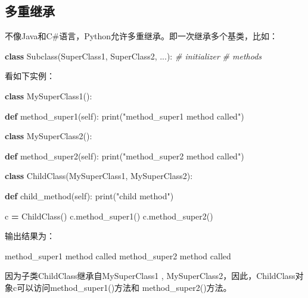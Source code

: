 \documentclass[]{ctexbook}
\newenvironment{Shaded}{\begin{snugshade}}{\end{snugshade}}
\newcommand{\BuiltInTok}[1]{#1}
\newcommand{\CommentTok}[1]{\textcolor[rgb]{0.56,0.35,0.01}{\textit{#1}}}
\newcommand{\KeywordTok}[1]{\textcolor[rgb]{0.13,0.29,0.53}{\textbf{#1}}}
\newcommand{\NormalTok}[1]{#1}
\newcommand{\OperatorTok}[1]{\textcolor[rgb]{0.81,0.36,0.00}{\textbf{#1}}}
\newcommand{\StringTok}[1]{\textcolor[rgb]{0.31,0.60,0.02}{#1}}
\newcommand{\VariableTok}[1]{\textcolor[rgb]{0.00,0.00,0.00}{#1}}
\begin{document}
\hypertarget{ux591aux91cdux7ee7ux627f}{%
\subsection{多重继承}\label{ux591aux91cdux7ee7ux627f}}

不像Java和C\#语言，Python允许多重继承。即一次继承多个基类，比如：

\begin{Shaded}
\begin{Highlighting}[]
\KeywordTok{class}\NormalTok{ Subclass(SuperClass1, SuperClass2, ...):}
   \CommentTok{# initializer}
   \CommentTok{# methods}
\end{Highlighting}
\end{Shaded}

看如下实例：

\begin{Shaded}
\begin{Highlighting}[]
\KeywordTok{class}\NormalTok{ MySuperClass1():}

    \KeywordTok{def}\NormalTok{ method_super1(}\VariableTok{self}\NormalTok{):}
        \BuiltInTok{print}\NormalTok{(}\StringTok{"method_super1 method called"}\NormalTok{)}

\KeywordTok{class}\NormalTok{ MySuperClass2():}

    \KeywordTok{def}\NormalTok{ method_super2(}\VariableTok{self}\NormalTok{):}
        \BuiltInTok{print}\NormalTok{(}\StringTok{"method_super2 method called"}\NormalTok{)}

\KeywordTok{class}\NormalTok{ ChildClass(MySuperClass1, MySuperClass2):}

    \KeywordTok{def}\NormalTok{ child_method(}\VariableTok{self}\NormalTok{):}
        \BuiltInTok{print}\NormalTok{(}\StringTok{"child method"}\NormalTok{)}

\NormalTok{c }\OperatorTok{=}\NormalTok{ ChildClass()}
\NormalTok{c.method_super1()}
\NormalTok{c.method_super2()}
\end{Highlighting}
\end{Shaded}

输出结果为：

\begin{Shaded}
\begin{Highlighting}[]
\NormalTok{method_super1 method called}
\NormalTok{method_super2 method called}
\end{Highlighting}
\end{Shaded}

因为子类ChildClass继承自MySuperClass1 , MySuperClass2，因此，ChildClass对象c可以访问method\_super1()方法和 method\_super2()方法。
\end{document}
